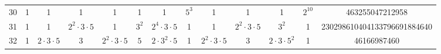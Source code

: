 \begin{table}
\begin{center}
\begin{adjustbox}{max width=\textwidth}
\begin{tabular}{|c|ccccccccccc|c|}
30& 1&1&1&1&1&1& $5^3$&1&1&1& $2^{10}$&463255047212958\\
31& 1&1& $2^2\cdot 3\cdot 5$&1& $3^2$& $2^4\cdot 3\cdot 5$&1&1& $2^2\cdot 3\cdot 5$& $3^2$&1&230298610404133796691884640\\
32& 1& $2\cdot 3\cdot 5$& $3$& $2^2\cdot 3\cdot 5$& $5$& $2\cdot 3^2\cdot 5$&1& $2^2\cdot 3\cdot 5$& $3$& $2\cdot 3\cdot 5^2$&1&46166987460\\

\end{tabular}
\end{adjustbox}
\end{center}
\end{table}
